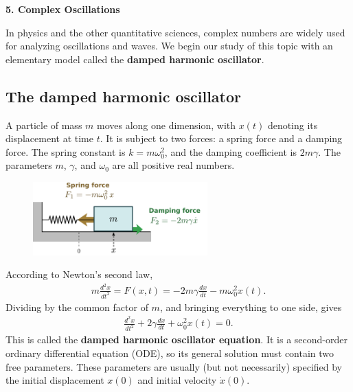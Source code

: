 \documentclass[10pt,a4paper]{article}
\begin{document}
\setcounter{page}{31}

\noindent
{\Large \textbf{5. Complex Oscillations}}
\vskip 0.2in

\label{complex-oscillations}

In physics and the other quantitative sciences, complex numbers are
widely used for analyzing oscillations and waves. We begin our study
of this topic with an elementary model called the \textbf{damped
  harmonic oscillator}.

\subsection{The damped harmonic oscillator}
\label{the-damped-harmonic-oscillator}

A particle of mass $m$ moves along one dimension, with $x(t)$ denoting
its displacement at time $t$. It is subject to two forces: a spring
force and a damping force. The spring constant is $k = m\omega_0^2$,
and the damping coefficient is $2m \gamma$.  The parameters $m$,
$\gamma$, and $\omega_0$ are all positive real numbers.

\begin{figure}[ht]
  \centering\includegraphics[width=0.6\textwidth]{oscillator}
\end{figure}

According to Newton's second law,
\begin{align}
  m \frac{d^2 x}{dt^2} = F(x,t) = - 2m\gamma \frac{dx}{dt} - m\omega_0^2 x(t).
\end{align}
Dividing by the common factor of $m$, and bringing everything to one
side, gives
\begin{align}
  \frac{d^2 x}{dt^2} + 2\gamma \frac{dx}{dt} + \omega_0^2 x(t) = 0.
\end{align}
This is called the \textbf{damped harmonic oscillator equation}. It is
a second-order ordinary differential equation (ODE), so its general
solution must contain two free parameters. These parameters are
usually (but not necessarily) specified by the initial displacement
$x(0)$ and initial velocity $\dot{x}(0)$.
\end{document}
